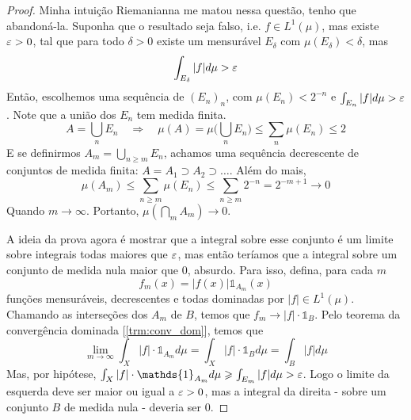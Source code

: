 \begin{proof}
    Minha intuição Riemanianna me matou nessa questão, tenho que abandoná-la. Suponha que o resultado seja falso, i.e. $f \in L^1(\mu)$, mas existe $\varepsilon > 0$, tal que 
    para todo $\delta > 0$ existe um mensurável $E_\delta$ com $\mu(E_\delta) < \delta$, mas 
    $$\int_{E_\delta} |f| d\mu > \varepsilon$$
    Então, escolhemos uma sequência de $(E_n)_n$, com $\mu(E_n) < 2^{-n}$ e $\int_{E_n} |f| d\mu > \varepsilon$. Note que a união dos $E_n$ tem medida finita.
    $$A = \bigcup_n E_n \quad \Rightarrow \quad \mu(A) = \mu \big(\bigcup_n E_n \big) \leq \sum_n \mu(E_n) \leq 2$$
    E se definirmos $A_m = \bigcup_{n\geq m} E_n$, achamos uma sequência decrescente de conjuntos de medida finita: $A = A_1 \supset A_2 \supset \dots$.
    Além do mais,
    $$\mu(A_m) \leq \sum_{n \geq m} \mu(E_n) \leq \sum_{n \geq m} 2^{-n} = 2^{-m + 1} \to 0$$
    Quando $m \to \infty$. Portanto, $\mu(\bigcap_m A_m) \to 0$.

    A ideia da prova agora é mostrar que a integral sobre esse conjunto é um limite sobre integrais todas maiores que $\varepsilon$, mas então teríamos
    que a integral sobre um conjunto de medida nula maior que $0$, absurdo. Para isso, defina, para cada $m$
    $$f_m(x) = |f(x)| \mathds{1}_{A_m}(x)$$
    funções mensuráveis, decrescentes e todas dominadas por $|f| \in L^1(\mu)$. Chamando as interseções dos $A_m$ de $B$,
    temos que $f_m \to |f| \cdot \mathds{1}_B$. Pelo teorema da convergência dominada [\ref{trm:conv_dom}], temos que 
    $$\lim_{m\to\infty} \int_X |f|\cdot \mathds{1}_{A_m} d\mu = \int_X |f| \cdot \mathds{1}_B d\mu = \int_B |f| d\mu$$
    Mas, por hipótese, $\int_X |f|\cdot \mathds{1}_{A_m} d\mu \geq \int_{E_m} |f| d\mu > \eps$. Logo o limite da esquerda deve ser maior ou igual a $\varepsilon > 0$,
    mas a integral da direita - sobre um conjunto $B$ de medida nula - deveria ser $0$.
\end{proof}

